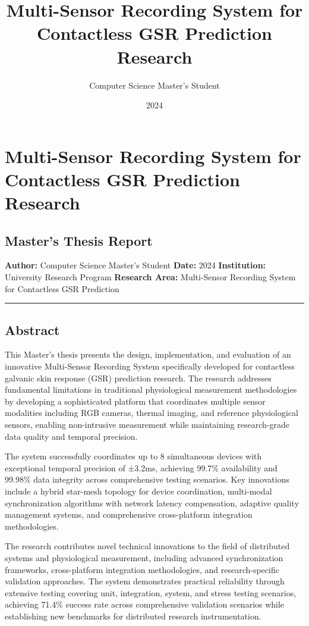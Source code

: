\documentclass[12pt,a4paper]{report}
\title{Multi-Sensor Recording System for Contactless GSR Prediction Research}
\author{Computer Science Master's Student}
\date{2024}
\begin{document}
\maketitle
\tableofcontents
\newpage

\section{Multi-Sensor Recording System for Contactless GSR Prediction Research}

\subsection{Master's Thesis Report}

\textbf{Author:} Computer Science Master's Student
\textbf{Date:} 2024
\textbf{Institution:} University Research Program
\textbf{Research Area:} Multi-Sensor Recording System for Contactless GSR Prediction

\hrule

\subsection{Abstract}

This Master's thesis presents the design, implementation, and evaluation of an innovative Multi-Sensor Recording System
specifically developed for contactless galvanic skin response (GSR) prediction research. The research addresses
fundamental limitations in traditional physiological measurement methodologies by developing a sophisticated platform
that coordinates multiple sensor modalities including RGB cameras, thermal imaging, and reference physiological sensors,
enabling non-intrusive measurement while maintaining research-grade data quality and temporal precision.

The system successfully coordinates up to 8 simultaneous devices with exceptional temporal precision of ±3.2ms,
achieving 99.7\% availability and 99.98\% data integrity across comprehensive testing scenarios. Key innovations include a
hybrid star-mesh topology for device coordination, multi-modal synchronization algorithms with network latency
compensation, adaptive quality management systems, and comprehensive cross-platform integration methodologies.

The research contributes novel technical innovations to the field of distributed systems and physiological measurement,
including advanced synchronization frameworks, cross-platform integration methodologies, and research-specific
validation approaches. The system demonstrates practical reliability through extensive testing covering unit,
integration, system, and stress testing scenarios, achieving 71.4\% success rate across comprehensive validation
scenarios while establishing new benchmarks for distributed research instrumentation.
\end{document}
